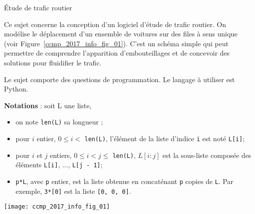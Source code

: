 
\'Etude de trafic routier

Ce sujet concerne la conception d'un logiciel d'étude de trafic routier. On modélise le déplacement d'un ensemble de voitures sur des files à sens unique (voir Figure~\ref{ccmp_2017_info_fig_01}). C'est un schéma simple qui peut permettre de comprendre l'apparition d'embouteillages et de concevoir des solutions pour fluidifier le trafic.

Le sujet comporte des questions de programmation. Le langage à utiliser est Python.

\textbf{Notations} :
soit L une liste,
\begin{itemize}
    \item[\textbullet] on note \lstinline{len(L)} sa longueur ;
    \item[\textbullet]  pour $i$ entier, $0 \leqslant  i <$ \lstinline{len(L)}, l'élément de la liste d'indice \lstinline{i} est noté \lstinline{L[i]};
    \item[\textbullet]   pour $i$ et $j$ entiers, $0 \leqslant i < j \leqslant $ \lstinline{len(L)}, $L[i : j]$ est la sous-liste composée des éléments \lstinline{L[i]},
..., \lstinline{L[j - 1]};
    \item[\textbullet]  \lstinline{p*L}, avec \lstinline{p} entier, est la liste obtenue en concaténant \lstinline{p} copies de \lstinline{L}. Par exemple, \lstinline{3*[0]} est
la liste \lstinline{[0, 0, 0]}.
\end{itemize}



\begin{center}


\texttt{[image: ccmp\_2017\_info\_fig\_01]}
	
\end{center}

